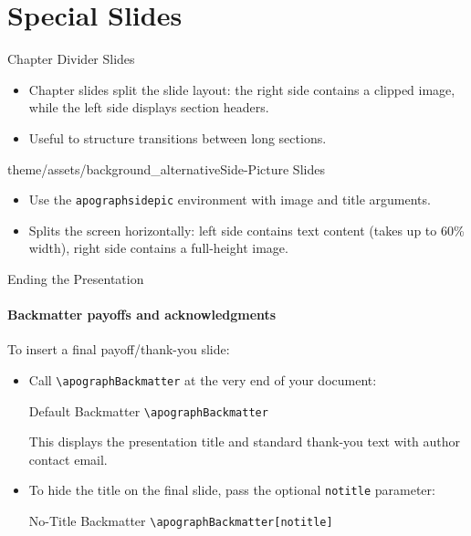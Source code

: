 
\section{Special Slides}

\begin{apographchapter}{}{Chapter Divider Slides}
\begin{itemize}
    \item Chapter slides split the slide layout: the right side contains a clipped image, while the left side displays section headers.
    \item Useful to structure transitions between long sections.
\end{itemize}
\end{apographchapter}

\begin{apographsidepic}{theme/assets/background_alternative}{Side-Picture Slides}
\begin{itemize}
    \item Use the \texttt{apographsidepic} environment with image and title arguments.
    \item Splits the screen horizontally: left side contains text content (takes up to 60\% width), right side contains a full-height image.
\end{itemize}
\end{apographsidepic}

\begin{frame}[fragile]{Ending the Presentation}
\framesubtitle{Backmatter payoffs and acknowledgments}
To insert a final payoff/thank-you slide:
\begin{itemize}
    \item Call \verb|\apographBackmatter| at the very end of your document:
    \begin{block}{Default Backmatter}
    \verb|\apographBackmatter|
    \end{block}
    This displays the presentation title and standard thank-you text with author contact email.
    \item To hide the title on the final slide, pass the optional \verb|notitle| parameter:
    \begin{block}{No-Title Backmatter}
    \verb|\apographBackmatter[notitle]|
    \end{block}
\end{itemize}
\end{frame}
